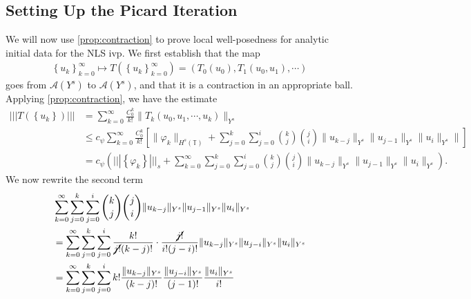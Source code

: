 \documentclass[12pt,reqno]{amsart}
\numberwithin{equation}{section}  %
\numberwithin{figure}{section}
\newcommand{\ci}{\mathbb{T}}
\newcommand{\vp}{\varphi}
\theoremstyle{plain}
\theoremstyle{definition}
\theoremstyle{remark}
\begin{document}
\subsection{Setting Up the Picard Iteration}
We will now use \autoref{prop:contraction} to prove local well-posedness for
analytic initial data for the NLS ivp. We first establish that the map 
%
%
\begin{equation*}
\begin{split}
  \left\{ u_k \right\}_{k=0}^{\infty} \mapsto T\left( \left\{ u_k
  \right\}_{k=0}^{\infty} \right) = \left( T_0(u_0), T_1(u_0, u_1), \cdots \right)
\end{split}
\end{equation*}
%
%
goes from $\mathcal{A}(Y^s)$ to $\mathcal{A}(Y^s)$, and that it is a contraction
in an appropriate ball.
%
Applying \autoref{prop:contraction}, we have the estimate
%
%
\begin{equation}
\begin{split}
  | | |T(\left\{ u_{k} \right\}) | | |
  & = \sum_{k=0}^{\infty} \frac{C_0^k}{k!} \|T_{k}(u_0, u_1, \cdots, u_k)
  \|_{Y^s}
  \\
  & \le c_{\psi} \sum_{k=0}^{\infty} \frac{C_0^k}{k!}\left[ \| \vp_{k}
  \|_{H^s(\ci)} + \sum_{j=0}^{k} \sum_{j=0}^{i} {k \choose j } {j \choose i }
  \|u_{k-j}\|_{Y^s} \| u_{j-1}\|_{Y^s} \|u_{i} \|_{Y^s} \| \right]
  \\
  & = c_{\psi}\left( | | | \left\{ \vp_{k} \right\} | | |_{s} +
  \sum_{k=0}^{\infty} \sum_{j=0}^{k}
  \sum_{j=0}^{i} {k \choose j } {j \choose i }
  \|u_{k-j}\|_{Y^s} \| u_{j-1}\|_{Y^s} \| u_{i} \|_{Y^s}\right).
\end{split}
\label{eqn:map-onto-ball}
\end{equation}
%
%
We now rewrite the second term
%
%
\begin{equation*}
\begin{split}
  & \sum_{k=0}^{\infty} \sum_{j=0}^{k}  \sum_{j=0}^{i} {k \choose j } {j \choose i } \|u_{k-j}\|_{Y^s}
\| u_{j-1}\|_{Y^s} \| u_{i} \|_{Y^s} 
  \\
  & = \sum_{k=0}^{\infty} \sum_{j=0}^{k}  \sum_{j=0}^{i} \frac{k!}{\cancel{j!}(k-j)!}
  \cdot \frac{\cancel{j!}}{i!(j-i)!} \| u_{k-j} \|_{Y^s} \| u_{j-i} \|_{Y^s} \|
  u_{i} \|_{Y^s}
  \\
  & = \sum_{k=0}^{\infty} \sum_{j=0}^{k}  \sum_{j=0}^{i}  k! \frac{\|
  u_{k-j} \|_{Y^s}}{(k-j)!} \frac{\| u_{j-i} \|_{Y^s}}{(j-1)!} \frac{\|
  u_{i} \|_{Y^s}}{i!}
\end{split}
\end{equation*}
\end{document}
